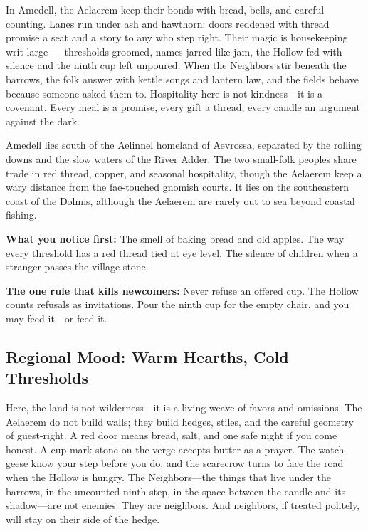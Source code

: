\documentclass[12pt,oneside]{book}
\begin{document}
\begin{tcolorbox}[colback=black!3,colframe=blue!60!black,title={Theme \& Atmosphere},breakable]
In Amedell, the Aelaerem keep their bonds with bread, bells, and careful counting. Lanes run under ash and hawthorn; doors reddened with thread promise a seat and a story to any who step right. Their magic is housekeeping writ large --- thresholds groomed, names jarred like jam, the Hollow fed with silence and the ninth cup left unpoured. When the Neighbors stir beneath the barrows, the folk answer with kettle songs and lantern law, and the fields behave because someone asked them to. Hospitality here is not kindness---it is a covenant. Every meal is a promise, every gift a thread, every candle an argument against the dark.

Amedell lies south of the Aelinnel homeland of Aevrossa, separated by the rolling downs and the slow waters of the River Adder. The two small-folk peoples share trade in red thread, copper, and seasonal hospitality, though the Aelaerem keep a wary distance from the fae-touched gnomish courts. It lies on the southeastern coast of the Dolmis, although the Aelaerem are rarely out to sea beyond coastal fishing.

\vspace{2mm}
\textbf{What you notice first:} The smell of baking bread and old apples. The way every threshold has a red thread tied at eye level. The silence of children when a stranger passes the village stone.

\textbf{The one rule that kills newcomers:} Never refuse an offered cup. The Hollow counts refusals as invitations. Pour the ninth cup for the empty chair, and you may feed it---or feed it.
\end{tcolorbox}

\subsection*{Regional Mood: Warm Hearths, Cold Thresholds}

Here, the land is not wilderness---it is a living weave of favors and omissions. The Aelaerem do not build walls; they build hedges, stiles, and the careful geometry of guest-right. A red door means bread, salt, and one safe night if you come honest. A cup-mark stone on the verge accepts butter as a prayer. The watch-geese know your step before you do, and the scarecrow turns to face the road when the Hollow is hungry. The Neighbors---the things that live under the barrows, in the uncounted ninth step, in the space between the candle and its shadow---are not enemies. They are neighbors. And neighbors, if treated politely, will stay on their side of the hedge.
\end{document}
